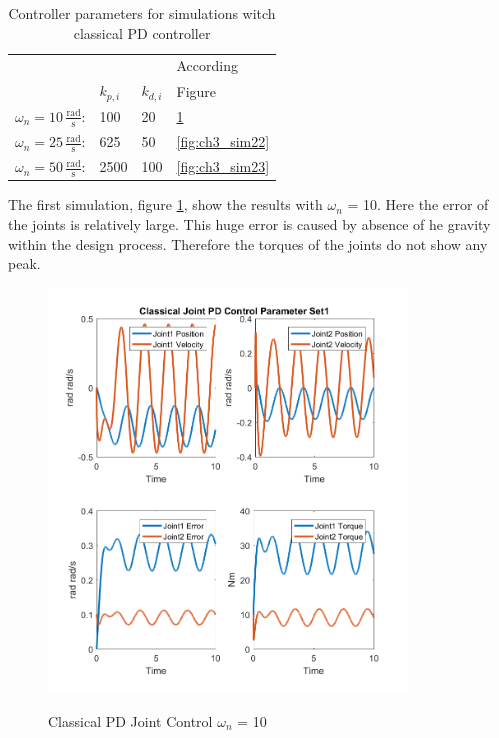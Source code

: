\begin{table}[h]
	\begin{center}
		
		\label{tab:ch3_pd}
		\begin{tabular}{llll}
			& & & According \\
			& $k_{p,i}$ & $k_{d,i}$ & Figure \\
			\midrule
			$\omega_n = 10\,\mathrm{\frac{rad}{s}}$: & 100 & 20 & \ref{fig:ch3_sim21} \\
			$\omega_n = 25\,\mathrm{\frac{rad}{s}}$: & 625 & 50 & \ref{fig:ch3_sim22} \\
			$\omega_n = 50\,\mathrm{\frac{rad}{s}}$: & 2500 & 100 & \ref{fig:ch3_sim23} \\
			\bottomrule
		\end{tabular}
	\caption{Controller parameters for simulations witch classical PD controller}
	\end{center}
\end{table}

The first simulation, figure \ref{fig:ch3_sim21}, show the results with $\omega_n$ = 10. Here the error of the joints is relatively large. This huge error is caused by absence of he gravity within the design process. Therefore the torques of the joints do not show any peak.\\

\begin{figure}[h]
	\centering
	\includegraphics[width=0.85\textwidth]{pics/ClassicalJointPDControlParameterSet1.png}\\
	\caption{Classical PD Joint Control $\omega_n$ = 10}
	\label{fig:ch3_sim21}
\end{figure}

